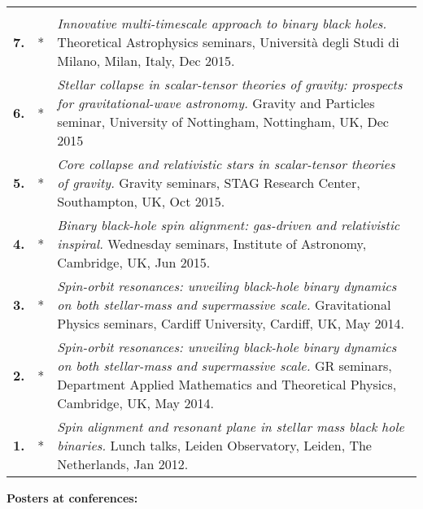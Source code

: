 \documentclass[letterpaper]{moderncv}
\begin{document}
{\begin{longtable}{rp{0.4cm}p{15.8cm}}
\vspace{0.05cm}\\
%
\textbf{7.} & *& \textit{Innovative multi-timescale approach to binary black holes.}
\newline{} 
Theoretical Astrophysics seminars, Università degli Studi di Milano, Milan, Italy, Dec 2015.
\vspace{0.05cm}\\
%
\textbf{6.} & *& \textit{Stellar collapse in scalar-tensor theories of gravity: prospects for gravitational-wave astronomy.}
\newline{} 
Gravity and Particles seminar, University of Nottingham, Nottingham, UK, Dec 2015
\vspace{0.05cm}\\
%
\textbf{5.} & *& \textit{Core collapse and relativistic stars in scalar-tensor theories of gravity.}
\newline{} 
Gravity seminars, STAG Research Center, Southampton, UK, Oct 2015.
\vspace{0.05cm}\\
%
\textbf{4.} & *& \textit{Binary black-hole spin alignment: gas-driven and relativistic inspiral.}
\newline{} 
Wednesday seminars, Institute of Astronomy, Cambridge, UK, Jun 2015.\vspace{0.05cm}\\
%
\textbf{3.} & *& \textit{Spin-orbit resonances: unveiling black-hole binary dynamics on both stellar-mass and supermassive scale.}
\newline{} 
Gravitational Physics seminars, Cardiff University, Cardiff, UK, May 2014.
\vspace{0.05cm}\\
%
\textbf{2.} & *& \textit{Spin-orbit resonances: unveiling black-hole binary dynamics on both stellar-mass and supermassive scale.}
\newline{} 
GR seminars, Department Applied Mathematics and Theoretical Physics, Cambridge, UK, May 2014.
\vspace{0.05cm}\\
%
\textbf{1.} & *& \textit{Spin alignment and resonant plane in stellar mass black hole binaries.}
\newline{} 
Lunch talks, Leiden Observatory, Leiden, The Netherlands, Jan 2012.
\vspace{0.05cm}\\
%
\end{longtable}
}


\textcolor{color1}{\textbf{Posters at conferences:}}
\end{document}

